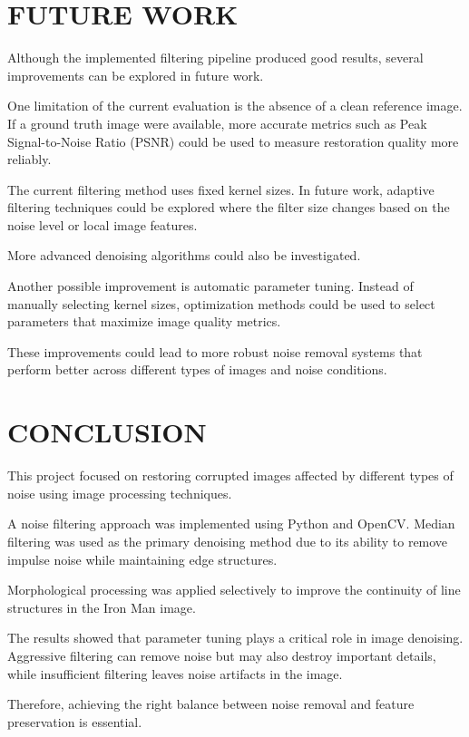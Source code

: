 \documentclass[letterpaper, 10 pt, conference]{ieeeconf}
\begin{document}
\section{FUTURE WORK}

Although the implemented filtering pipeline produced good results, several improvements can be explored in future work.

One limitation of the current evaluation is the absence of a clean reference image. 
If a ground truth image were available, more accurate metrics such as Peak Signal-to-Noise Ratio (PSNR) could be used to measure restoration quality more reliably.

The current filtering method uses fixed kernel sizes. In future work, adaptive filtering techniques could be explored where the filter size changes based on the noise level or local image features.

More advanced denoising algorithms could also be investigated. 

Another possible improvement is automatic parameter tuning. Instead of manually selecting kernel sizes, optimization methods could be used to select parameters that maximize image quality metrics.

These improvements could lead to more robust noise removal systems that perform better across different types of images and noise conditions.



\section*{CONCLUSION}


This project focused on restoring corrupted images affected by different types of noise using image processing techniques. 


A noise filtering approach was implemented using Python and OpenCV. Median filtering was used as the primary denoising method due to its ability to remove impulse noise while maintaining edge structures. 

Morphological processing was applied selectively to improve the continuity of line structures in the Iron Man image. 


The results showed that parameter tuning plays a critical role in image denoising. Aggressive filtering can remove noise but may also destroy important details, while insufficient filtering leaves noise artifacts in the image. 

Therefore, achieving the right balance between noise removal and feature preservation is essential.
\end{document}
